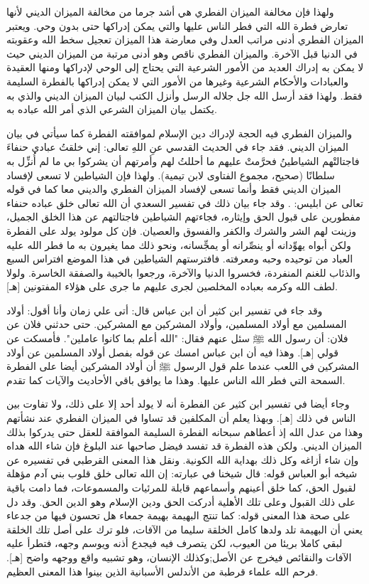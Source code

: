 ولهذا فإن مخالفة الميزان الفطري هي أشد جرما من مخالفة الميزان الديني لأنها تعارض فطرة الله التي فطر الناس عليها والتي يمكن إدراكها حتى بدون وحي. ويعتبر الميزان الفطري أدنى مراتب العدل وفي معارضة هذا الميزان تعجيل سخط الله وعقوبته في الدنيا قبل الآخرة. والميزان الفطري ناقص وهو أدنى مرتبة من الميزان الديني حيث لا يمكن به إدراك العديد من الأمور الشرعية التي يحتاج إلى الوحي لإدراكها ومنها العقيدة والعبادات والأحكام الشرعية وغيرها من الأمور التي لا يمكن إدراكها بالفطرة السليمة فقط. ولهذا فقد أرسل الله جل جلاله الرسل وأنزل الكتب لبيان الميزان الديني والذي به يكتمل بيان الميزان الشرعي الذي أمر الله عباده به.

والميزان الفطري فيه الحجة لإدراك دين الإسلام لموافقته الفطرة كما سيأتي في بيان الميزان الديني. فقد جاء في الحديث القدسي عنِ اللهِ تعالى: إني خلقتُ عبادي حنفاءَ فاجتالتْهم الشياطينُ فحرَّمتْ عليهم ما أحللتُ لهم وأمرتهم أن يشركوا بي ما لم أُنزِّل به سلطانًا {\footnotesize (صحيح، مجموع الفتاوى لابن تيمية)}.
ولهذا فإن الشياطين لا تسعى لإفساد الميزان الديني فقط وأنما تسعى لإفساد الميزان الفطري والديني معا كما في قوله تعالى عن ابليس: 
\quranayah*[4][119]{\footnotesize \surahname*[4]}. وقد جاء بيان ذلك في تفسير السعدي أن الله تعالى خلق عباده حنفاء مفطورين على قبول الحق وإيثاره، فجاءتهم الشياطين فاجتالتهم عن هذا الخلق الجميل، وزينت لهم الشر والشرك والكفر والفسوق والعصيان. فإن كل مولود يولد على الفطرة ولكن أبواه يهوِّدانه أو ينصِّرانه أو يمجِّسانه، ونحو ذلك مما يغيرون به ما فطر الله عليه العباد من توحيده وحبه ومعرفته. فافترستهم الشياطين في هذا الموضع افتراس السبع والذئاب للغنم المنفردة، فخسروا الدنيا والآخرة، ورجعوا بالخيبة والصفقة الخاسرة. ولولا لطف الله وكرمه بعباده المخلصين لجرى عليهم ما جرى على هؤلاء المفتونين [هـ].

وقد جاء في تفسير ابن كثير أن ابن عباس قال: 
أتى علي زمان وأنا أقول: أولاد المسلمين مع أولاد المسلمين، وأولاد المشركين مع المشركين. حتى حدثني فلان عن فلان: أن رسول الله ﷺ سئل عنهم فقال: "الله أعلم بما كانوا عاملين". فأمسكت عن قولي [هـ]. وهذا فيه أن ابن عباس امسك عن قوله بفصل أولاد المسلمين عن أولاد المشركين في اللعب عندما علم قول الرسول ﷺ أن أولاد المشركين أيضا على الفطرة السمحة التي فطر الله الناس عليها. وهذا ما يوافق باقي الأحاديث والآيات كما تقدم. 

وجاء أيضا في تفسير ابن كثير عن الفطرة أنه لا يولد أحد إلا على ذلك، ولا تفاوت بين الناس في ذلك [هـ]. وبهذا يعلم أن المكلفين قد تساوا في الميزان الفطري عند نشأتهم وهذا من عدل الله إذ أعطاهم سبحانه الفطرة السليمة الموافقة للعقل حتى يدركوا بذلك الميزان الديني. ولكن هذه الفطرة قد تفسد فيضل صاحبها عند البلوغ فإن شاء الله هداه وإن شاء أزاغه وكل ذلك بهداية الله الكونية. ونقل هذا المعنى القرطبي في تفسيره عن شيخه أبو العباس قوله: قال شيخنا في عبارته: إن الله تعالى خلق قلوب بني آدم مؤهلة لقبول الحق، كما خلق أعينهم وأسماعهم قابلة للمرئيات والمسموعات، فما دامت باقية على ذلك القبول وعلى تلك الأهلية أدركت الحق ودين الإسلام وهو الدين الحق. وقد دل على صحة هذا المعنى قوله: كما تنتج البهيمة بهيمة جمعاء هل تحسون فيها من جدعاء يعني أن البهيمة تلد ولدها كامل الخلقة سليما من الآفات، فلو ترك على أصل تلك الخلقة لبقي كاملا بريئا من العيوب، لكن يتصرف فيه فيجدع أذنه ويوسم وجهه، فتطرأ عليه الآفات والنقائص فيخرج عن الأصل;وكذلك الإنسان، وهو تشبيه واقع ووجهه واضح [هـ]. فرحم الله علماء قرطبة من الأندلس الأسبانية الذين بينوا هذا المعنى العظيم.

